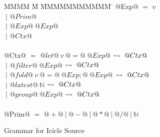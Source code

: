 
\begin{figure}

\begin{tabbing}
MMMM \= M \= MMMMMMMMMMM \= \kill
@Exp@
    \> $=$  \> $v$ \\
    \> $~|$ \> $@Prim@$ \\
    \> $~|$ \> $@Exp@~@Exp@$ \\
    \> $~|$ \> $@Ctx@$ \\
\\
@Ctx@
    \> $=$  \> $@let@~v~@=@~@Exp@$
            \> $\leadsto~@Ctx@$ \\
    \> $~|$ \> $@filter@~@Exp@$
            \> $\leadsto~@Ctx@$ \\
    \> $~|$ \> $@fold@~v~@=@~@Exp;@~@Exp@$
            \> $\leadsto~@Ctx@$ \\

    \> $~|$ \> $@latest@~\mathbb{N}$
            \> $\leadsto~@Ctx@$ \\

    \> $~|$ \> $@group@~@Exp@$
            \> $\leadsto~@Ctx@$ \\
\\
@Prim@
    \> $=$  \> $@+@~|~@-@~|~@*@~|~@/@~|~\mathbb{N}$ \\
\end{tabbing}


\caption{Grammar for Icicle Source}
\label{fig:source:grammar}
\end{figure}

